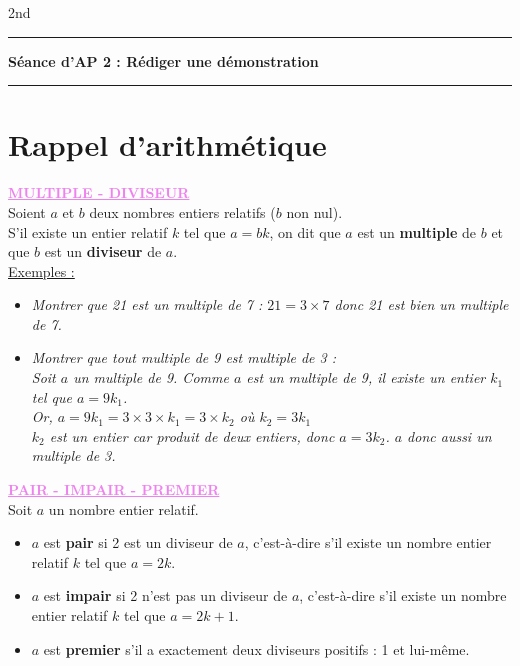 \documentclass[a4paper,12pt]{article}
\newcommand{\bi}{\begin{itemize}}
\newcommand{\ei}{\end{itemize}}
\newcommand{\titre}[5] 
{
\noindent #2 \hfill #4 \\
#3 \hfill #5

\vspace{-1.6cm}

\begin{center}\rule{6cm}{0.5mm}\end{center}
\vspace{0.2cm}
\begin{center}{\Large{\textbf{#1}}}\end{center}
\begin{center}\rule{6cm}{0.5mm}\end{center}
}
\begin{document}
\pagestyle{empty}

\titre{Séance d'AP 2 : Rédiger une démonstration}{}{}{2nd}{}

\vspace*{0.2cm}

\section{Rappel d'arithmétique}



\textbf{\textcolor{violet}{\underline{MULTIPLE - DIVISEUR}}}\\
Soient $a$ et $b$ deux nombres entiers relatifs ($b$ non nul).\\
S'il existe un entier relatif $k$ tel que $a = bk$, on dit que $a$ est un \textbf{multiple} de $b$ et que $b$ est un \textbf{diviseur} de $a$.\\

\underline{Exemples :}
\bi
\item\textit{Montrer que 21 est un multiple de 7 : $21=3 \times 7$ donc 21 est bien un multiple de 7.}\\

\item \textit{Montrer que tout multiple de 9 est multiple de 3 : \\
Soit $a$ un multiple de 9.  Comme $a$ est un multiple de 9, il existe un entier $k_{1}$ tel que $a=9k_{1}$. }\\
\textit{Or, $a=9k_{1}=3 \times 3 \times k_{1}=3 \times k_{2} $ où $k_{2} = 3k_{1}$}\\
\textit{$k_{2}$ est un entier car produit de deux entiers, donc $a=3k_{2}$. $a$ donc aussi un multiple de 3.}\\
\ei

\vspace*{0.5cm}

\textbf{\textcolor{violet}{\underline{PAIR - IMPAIR - PREMIER}}}\\
Soit $a$ un nombre entier relatif.
\bi 
\item $a$ est \textbf{pair} si 2 est un diviseur de $a$, c'est-à-dire s'il existe un nombre entier relatif $k$ tel que $a = 2k$.
\item $a$ est \textbf{impair} si 2 n’est pas un diviseur de $a$, c'est-à-dire s'il existe un nombre entier relatif $k$ tel que $a = 2k + 1$.
\item $a$ est \textbf{premier} s'il a exactement deux diviseurs positifs : 1 et lui-même.\\
\ei
\end{document}

